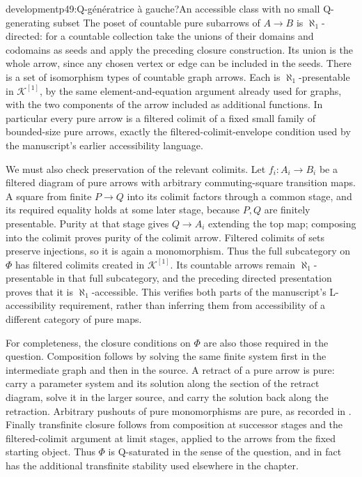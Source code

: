 \begin{dcomment}{development}{p49:Q-génératrice à gauche?}{An accessible class with no small Q-generating subset}
The poset of countable pure subarrows of $A\to B$ is $\aleph_1$-directed: for a countable collection take the unions of their domains and codomains as seeds and apply the preceding closure construction. Its union is the whole arrow, since any chosen vertex or edge can be included in the seeds. There is a set of isomorphism types of countable graph arrows. Each is $\aleph_1$-presentable in $\mathcal K^{[1]}$, by the same element-and-equation argument already used for graphs, with the two components of the arrow included as additional functions. In particular every pure arrow is a filtered colimit of a fixed small family of bounded-size pure arrows, exactly the filtered-colimit-envelope condition used by the manuscript's earlier accessibility language.

We must also check preservation of the relevant colimits. Let $f_i:A_i\to B_i$ be a filtered diagram of pure arrows with arbitrary commuting-square transition maps. A square from finite $P\to Q$ into its colimit factors through a common stage, and its required equality holds at some later stage, because $P,Q$ are finitely presentable. Purity at that stage gives $Q\to A_i$ extending the top map; composing into the colimit proves purity of the colimit arrow. Filtered colimits of sets preserve injections, so it is again a monomorphism. Thus the full subcategory on $\Phi$ has filtered colimits created in $\mathcal K^{[1]}$. Its countable arrows remain $\aleph_1$-presentable in that full subcategory, and the preceding directed presentation proves that it is $\aleph_1$-accessible. This verifies both parts of the manuscript's L-accessibility requirement, rather than inferring them from accessibility of a different category of pure maps.

For completeness, the closure conditions on $\Phi$ are also those required in the question. Composition follows by solving the same finite system first in the intermediate graph and then in the source. A retract of a pure arrow is pure: carry a parameter system and its solution along the section of the retract diagram, solve it in the larger source, and carry the solution back along the retraction. Arbitrary pushouts of pure monomorphisms are pure, as recorded in \citet[Fact~2.9(iii)]{CoxEtAl2026Pure}. Finally transfinite closure follows from composition at successor stages and the filtered-colimit argument at limit stages, applied to the arrows from the fixed starting object. Thus $\Phi$ is Q-saturated in the sense of the question, and in fact has the additional transfinite stability used elsewhere in the chapter.


\end{dcomment}
